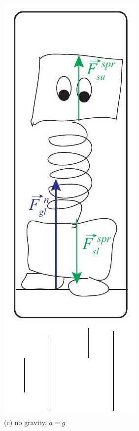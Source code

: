 \documentclass[10pt]{article}
\begin{document}
\includegraphics[max width=\textwidth, center]{2024_09_14_9969b06773f10b6936e8g-256(2)}\\
(c) no gravity, $a=g$
\end{document}
